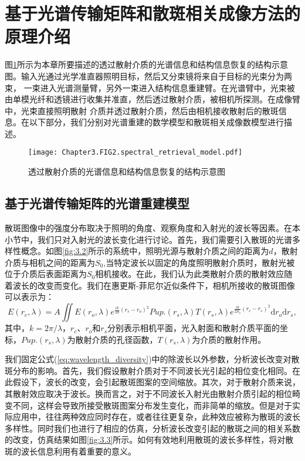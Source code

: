\section{基于光谱传输矩阵和散斑相关成像方法的原理介绍}
图\ref{fig:3.1}所示为本章所要描述的透过散射介质的光谱信息和结构信息恢复的结构示意图。输入光通过光学准直器照明目标，然后又分束镜将来自于目标的光束分为两束，
一束进入光谱测量臂，另外一束进入结构信息重建臂。在光谱臂中，光束被由单模光纤和透镜进行收集并准直，然后透过散射介质，被相机所探测。在成像臂中，光束直接照明散射
介质并透过散射介质，然后由相机接收散射后的散斑信息。在以下部分，我们分别对光谱重建的数学模型和散斑相关成像数模型进行描述。
\begin{figure}[htp]
	\centering
	\texttt{[image: Chapter3.FIG2.spectral\_retrieval\_model.pdf]}
	\caption{透过散射介质的光谱信息和结构信息恢复的结构示意图}
	\label{fig:3.1}
\end{figure}

\subsection{基于光谱传输矩阵的光谱重建模型}
散斑图像中的强度分布取决于照明的角度、观察角度和入射光的波长等因素。在本小节中，我们只对入射光的波长变化进行讨论。首先，我们需要引入散斑的光谱多样性概念。如图\ref{fig:3.2}所示的系统中，照明光源与散射介质之间的距离为$d$，散射介质与相机之间的距离为$S_{0}$,当特定波长以固定的角度照明散射介质时，散射光被位于介质后表面距离为$S_{0}$相机接收。在此，我们认为此类散射介质的散射效应随着波长的改变而变化。我们在惠更斯-菲尼尔近似条件下，相机所接收的散斑图像可以表示为：
\begin{equation}
    E(r_{c},\lambda) = A\iint E(r_{o},\lambda)e^{\frac{ik}{2d}(r_{s}-r_{o})^{2}}Pup.(r_{s},\lambda)T(r_{s},\lambda)e^{\frac{ik}{2S_{o}}(r_{c}-r_{s})^{2}}\mathrm{d}{r_{o}}\mathrm{d}{r_{s}}
\label{eq:wavelength_diversity},
\end{equation}
其中，$k =2\pi/\lambda$，$r_{c}$、$r_{o}$和$r_{s}$分别表示相机平面，光入射面和散射介质平面的坐标，$Pup.(r_{s},\lambda)$为散射介质的孔径函数，$T(r_{s},\lambda)$为介质的散射作用。

我们固定公式(\ref{eq:wavelength_diversity})中的除波长以外参数，分析波长改变对散斑分布的影响。首先，我们假设散射介质对于不同波长光引起的相位变化相同。在此假设下，波长的改变，会引起散斑图案的空间缩放。其次，对于散射介质来说，其散射效应取决于波长。换而言之，对于不同波长入射光由散射介质引起的相位畸变不同，这样会导致所接受散斑图案分布发生变化，而非简单的缩放。但是对于实际应用中，往往两种效应同时存在，或者往往更复杂，此种效应被称为散斑的波长多样性。同时我们也进行了相应的仿真，分析波长改变引起的散斑之间的相关系数的改变，仿真结果如图\ref{fig:3.3}所示。如何有效地利用散斑的波长多样性，将对散斑的波长信息利用有着重要的意义。

